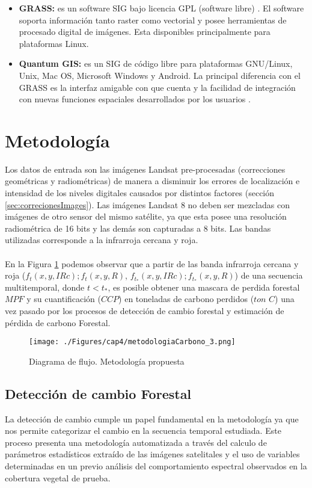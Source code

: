 \begin{itemize}
	\item \textbf{GRASS: }es un software SIG  bajo licencia GPL (software libre) \cite{osgeoGrass}. El software soporta informaci\'on tanto raster como vectorial y posee herramientas de procesado digital de im\'agenes. Esta disponibles principalmente para plataformas Linux.
	\item \textbf{Quantum GIS: }es un SIG de c\'odigo libre para plataformas GNU/Linux, Unix, Mac OS, Microsoft Windows y Android. La principal diferencia con el GRASS es la interfaz amigable con que cuenta y la facilidad de integraci\'on con nuevas funciones espaciales desarrollados por los usuarios \cite{qgisSIG}.
\end{itemize}

\section{Metodolog\'ia}
Los datos de entrada son las im\'agenes Landsat pre-procesadas (correcciones geom\'etricas y radiom\'etricas) de manera a disminuir los errores de localizaci\'on e intensidad de los niveles digitales causados por distintos factores (secci\'on \ref{sec:correcionesImages}).  
Las im\'agenes Landsat 8 no deben ser mezcladas con im\'agenes de otro sensor del mismo sat\'elite, ya que esta posee una resoluci\'on radiom\'etrica de 16 bits y las dem\'as son capturadas a 8 bits. Las bandas utilizadas corresponde a la infrarroja cercana y roja.\\~\\
En la Figura \ref{fig:metodologiapc} podemos observar que a partir de las banda infrarroja cercana y roja ($ f_{t}(x,y,IRc);f_{t}(x,y,R) $, $ f_{t_{*}}(x,y,IRc);f_{t_{*}}(x,y,R) $) de una secuencia multitemporal, donde $ t < t_{*} $, es posible obtener una mascara de perdida forestal $ MPF $ y su cuantificaci\'on ($ CCP $) en toneladas de carbono perdidos ($ ton $ $ C $) una vez pasado por los procesos de detecci\'on de cambio forestal y estimaci\'on de p\'erdida de carbono Forestal.
\begin{figure}[H]
	\centering
	\texttt{[image: ./Figures/cap4/metodologiaCarbono\_3.png]}
	\caption{Diagrama de flujo. Metodolog\'ia propuesta}
	\label{fig:metodologiapc}
\end{figure}

\subsection{Detecci\'on de cambio Forestal}
La detecci\'on de cambio cumple un papel fundamental en la metodolog\'ia ya que nos permite categorizar el cambio en la secuencia temporal estudiada. Este proceso presenta una metodolog\'ia automatizada a trav\'es del calculo de par\'ametros estad\'isticos extra\'ido de las im\'agenes satelitales y el uso de variables determinadas en un previo an\'alisis del comportamiento espectral observados en la cobertura vegetal de prueba.

